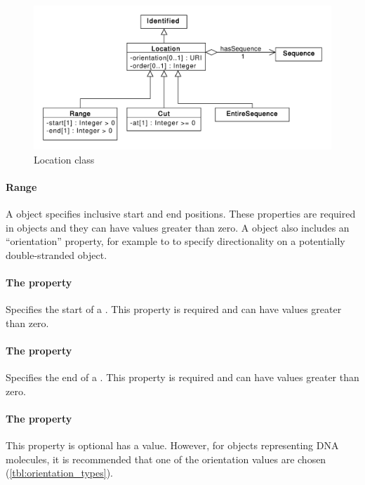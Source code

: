 \begin{figure}[ht]
\begin{center}
\includegraphics[scale=0.6]{uml/location}
\caption[]{Location class}
\label{uml:location}
\end{center}
\end{figure}




\paragraph{Range}
\label{sec:Range}
A  object specifies inclusive start and end positions. These properties are required in  objects and they can have  values greater than zero. A  object also includes an  ``orientation'' property, for example to to specify directionality on a potentially double-stranded  object.

\paragraph{The  property}
Specifies the start of a . This property is required and can have  values greater than zero.

\paragraph{The  property}
Specifies the end of a . This property is required and can have  values greater than zero.

\paragraph{The  property}
This property is optional has a  value. However, for  objects representing DNA molecules, it is recommended that one of the orientation values are chosen (\ref{tbl:orientation_types}). 

